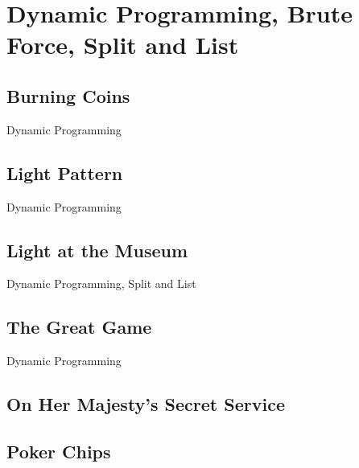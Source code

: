 \documentclass[10pt,a4paper,twoside]{report}
\begin{document}
\section{Dynamic Programming, Brute Force, Split and List}

\subsection*{Burning Coins}
\begin{keywords}Dynamic Programming\end{keywords}


\newpage
\subsection*{Light Pattern}
\begin{keywords}Dynamic Programming\end{keywords}


\newpage
\subsection*{Light at the Museum}
\begin{keywords}Dynamic Programming, Split and List\end{keywords}


\newpage
\subsection*{The Great Game}
\begin{keywords}Dynamic Programming\end{keywords}


\newpage
\subsection*{On Her Majesty's Secret Service}
\begin{keywords}\end{keywords}


\newpage
\subsection*{Poker Chips}
\begin{keywords}\end{keywords}

\end{document}
